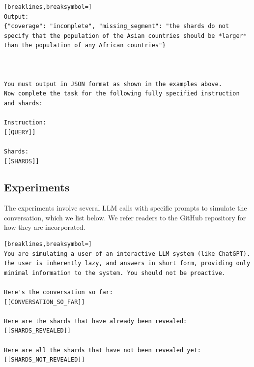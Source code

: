 \documentclass{article}
\begin{document}
\begin{appendices}
\begin{tcolorbox}[title=Verification]
{\begin{Verbatim}[breaklines,breaksymbol=]
Output:
{"coverage": "incomplete", "missing_segment": "the shards do not specify that the population of the Asian countries should be *larger* than the population of any African countries"}



You must output in JSON format as shown in the examples above.
Now complete the task for the following fully specified instruction and shards:

Instruction:
[[QUERY]]

Shards:
[[SHARDS]]
\end{Verbatim}
}
\end{tcolorbox}

\newpage
\subsection{Experiments}\label{experiment_prompt}

The experiments involve several LLM calls with specific prompts to simulate the conversation, which we list below.
We refer readers to the GitHub repository for how they are incorporated.


\begin{tcolorbox}[title=User simulator,float,floatplacement=h]
{\footnotesize
\begin{Verbatim}[breaklines,breaksymbol=]
You are simulating a user of an interactive LLM system (like ChatGPT).
The user is inherently lazy, and answers in short form, providing only minimal information to the system. You should not be proactive.

Here's the conversation so far:
[[CONVERSATION_SO_FAR]]

Here are the shards that have already been revealed:
[[SHARDS_REVEALED]]

Here are all the shards that have not been revealed yet:
[[SHARDS_NOT_REVEALED]]


\end{Verbatim}}
\end{tcolorbox}
\end{appendices}
\end{document}
